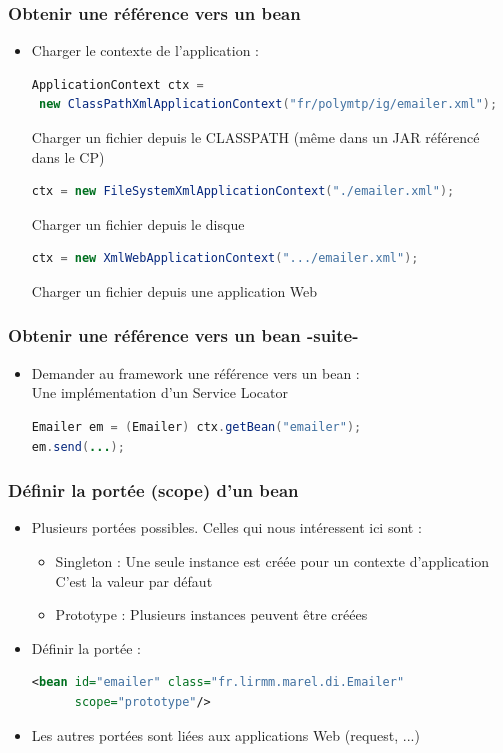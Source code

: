 \documentclass{beamer}
\begin{document}
\begin{frame}[fragile]
  \frametitle{Obtenir une référence vers un bean}
  \begin{itemize}
  \item Charger le contexte de l'application :
\begin{lstlisting}[language=Java,basicstyle=\scriptsize]    
ApplicationContext ctx =
 new ClassPathXmlApplicationContext("fr/polymtp/ig/emailer.xml");
\end{lstlisting}
Charger un fichier depuis le CLASSPATH (même dans un JAR référencé dans le CP)
\begin{lstlisting}[language=Java,basicstyle=\scriptsize]
ctx = new FileSystemXmlApplicationContext("./emailer.xml");
\end{lstlisting}
Charger un fichier depuis le disque
 \begin{lstlisting}[language=Java,basicstyle=\scriptsize]
   ctx = new XmlWebApplicationContext(".../emailer.xml");   
\end{lstlisting}
Charger un fichier depuis une application Web
  \end{itemize}
\end{frame}

\begin{frame}[fragile]
  \frametitle{Obtenir une référence vers un bean -suite-}
  \begin{itemize}
\item Demander au framework une référence vers un bean :\\
  Une implémentation d'un Service Locator
   \begin{lstlisting}[language=Java]
Emailer em = (Emailer) ctx.getBean("emailer");
em.send(...);
\end{lstlisting}
  \end{itemize}
\end{frame}

\begin{frame}[fragile]
  \frametitle{Définir la portée (scope) d'un bean}
  \begin{itemize}
  \item Plusieurs portées possibles. Celles qui nous intéressent ici sont :
    \begin{itemize}
    \item Singleton : Une seule instance est créée pour un contexte d'application\\
      C'est la valeur par défaut
    \item Prototype : Plusieurs instances peuvent être créées
    \end{itemize}
  \item Définir la portée :
    \begin{lstlisting}[language=XML,basicstyle=\scriptsize]
<bean id="emailer" class="fr.lirmm.marel.di.Emailer"
      scope="prototype"/>
\end{lstlisting}
 
\item Les autres portées sont liées aux applications Web (request, ...)

  \end{itemize}
\end{frame}
\end{document}
